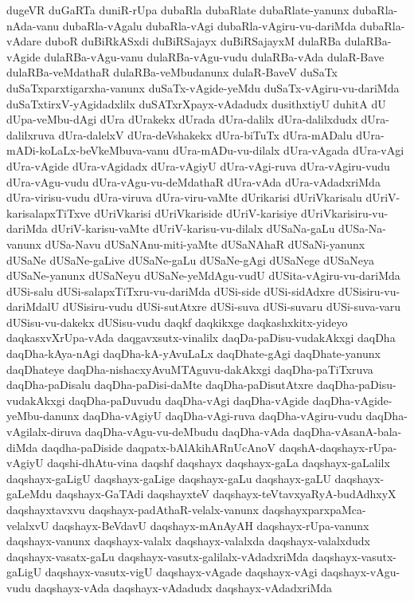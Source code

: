 {dugeVR
duGaRTa
duniR-rUpa
dubaRla
dubaRlate
dubaRlate-yanunx
dubaRla-nAda-vanu
dubaRla-vAgalu
dubaRla-vAgi
dubaRla-vAgiru-vu-dariMda
dubaRla-vAdare
duboR
duBiRkASxdi
duBiRSajayx
duBiRSajayxM
dulaRBa
dulaRBa-vAgide
dulaRBa-vAgu-vanu
dulaRBa-vAgu-vudu
dulaRBa-vAda
dulaR-Bave
dulaRBa-veMdathaR
dulaRBa-veMbudanunx
dulaR-BaveV
duSaTx
duSaTxparxtigarxha-vanunx
duSaTx-vAgide-yeMdu
duSaTx-vAgiru-vu-dariMda
duSaTxtirxV-yAgidadxlilx
duSATxrXpayx-vAdadudx
dusithxtiyU
duhitA
dU
dUpa-veMbu-dAgi
dUra
dUrakekx
dUrada
dUra-dalilx
dUra-dalilxdudx
dUra-dalilxruva
dUra-dalelxV
dUra-deVshakekx
dUra-biTuTx
dUra-mADalu
dUra-mADi-koLaLx-beVkeMbuva-vanu
dUra-mADu-vu-dilalx
dUra-vAgada
dUra-vAgi
dUra-vAgide
dUra-vAgidadx
dUra-vAgiyU
dUra-vAgi-ruva
dUra-vAgiru-vudu
dUra-vAgu-vudu
dUra-vAgu-vu-deMdathaR
dUra-vAda
dUra-vAdadxriMda
dUra-virisu-vudu
dUra-viruva
dUra-viru-vaMte
dUrikarisi
dUriVkarisalu
dUriV-karisalapxTiTxve
dUriVkarisi
dUriVkariside
dUriV-karisiye
dUriVkarisiru-vu-dariMda
dUriV-karisu-vaMte
dUriV-karisu-vu-dilalx
dUSaNa-gaLu
dUSa-Na-vanunx
dUSa-Navu
dUSaNAnu-miti-yaMte
dUSaNAhaR
dUSaNi-yanunx
dUSaNe
dUSaNe-gaLive
dUSaNe-gaLu
dUSaNe-gAgi
dUSaNege
dUSaNeya
dUSaNe-yanunx
dUSaNeyu
dUSaNe-yeMdAgu-vudU
dUSita-vAgiru-vu-dariMda
dUSi-salu
dUSi-salapxTiTxru-vu-dariMda
dUSi-side
dUSi-sidAdxre
dUSisiru-vu-dariMdalU
dUSisiru-vudu
dUSi-sutAtxre
dUSi-suva
dUSi-suvaru
dUSi-suva-varu
dUSisu-vu-dakekx
dUSisu-vudu
daqkf
daqkikxge
daqkashxkitx-yideyo
daqkasxvXrUpa-vAda
daqgavxsutx-vinalilx
daqDa-paDisu-vudakAkxgi
daqDha
daqDha-kAya-nAgi
daqDha-kA-yAvuLaLx
daqDhate-gAgi
daqDhate-yanunx
daqDhateye
daqDha-nishacxyAvuMTAguvu-dakAkxgi
daqDha-paTiTxruva
daqDha-paDisalu
daqDha-paDisi-daMte
daqDha-paDisutAtxre
daqDha-paDisu-vudakAkxgi
daqDha-paDuvudu
daqDha-vAgi
daqDha-vAgide
daqDha-vAgide-yeMbu-danunx
daqDha-vAgiyU
daqDha-vAgi-ruva
daqDha-vAgiru-vudu
daqDha-vAgilalx-diruva
daqDha-vAgu-vu-deMbudu
daqDha-vAda
daqDha-vAsanA-bala-diMda
daqdha-paDiside
daqpatx-bAlAkihARnUcAnoV
daqshA-daqshayx-rUpa-vAgiyU
daqshi-dhAtu-vina
daqshf
daqshayx
daqshayx-gaLa
daqshayx-gaLalilx
daqshayx-gaLigU
daqshayx-gaLige
daqshayx-gaLu
daqshayx-gaLU
daqshayx-gaLeMdu
daqshayx-GaTAdi
daqshayxteV
daqshayx-teVtavxyaRyA-budAdhxyX
daqshayxtavxvu
daqshayx-padAthaR-velalx-vanunx
daqshayxparxpaMca-velalxvU
daqshayx-BeVdavU
daqshayx-mAnAyAH
daqshayx-rUpa-vanunx
daqshayx-vanunx
daqshayx-valalx
daqshayx-valalxda
daqshayx-valalxdudx
daqshayx-vasatx-gaLu
daqshayx-vasutx-galilalx-vAdadxriMda
daqshayx-vasutx-gaLigU
daqshayx-vasutx-vigU
daqshayx-vAgade
daqshayx-vAgi
daqshayx-vAgu-vudu
daqshayx-vAda
daqshayx-vAdadudx
daqshayx-vAdadxriMda
}
